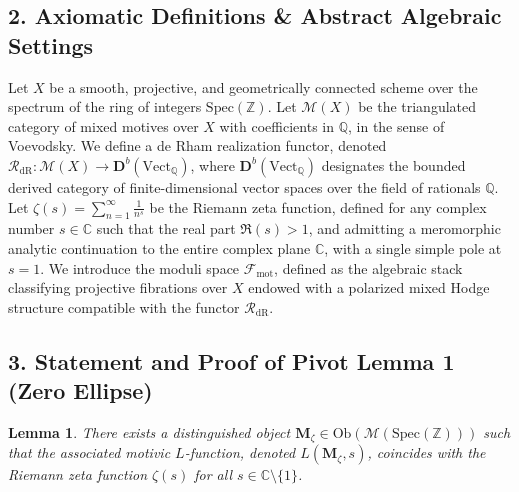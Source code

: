 \documentclass[
]{article}
\newtheorem{lemma}{Lemma}
\begin{document}
\hypertarget{axiomatic-definitions-abstract-algebraic-settings}{%
\subsection{2. Axiomatic Definitions \& Abstract Algebraic
Settings}\label{axiomatic-definitions-abstract-algebraic-settings}}

Let \(X\) be a smooth, projective, and geometrically connected scheme
over the spectrum of the ring of integers \(\mathrm{Spec}(\mathbb{Z})\).
Let \(\mathcal{M}(X)\) be the triangulated category of mixed motives
over \(X\) with coefficients in \(\mathbb{Q}\), in the sense of
Voevodsky. We define a de Rham realization functor, denoted
\(\mathcal{R}_{\mathrm{dR}} : \mathcal{M}(X) \rightarrow \mathbf{D}^b(\mathrm{Vect}_{\mathbb{Q}})\),
where \(\mathbf{D}^b(\mathrm{Vect}_{\mathbb{Q}})\) designates the
bounded derived category of finite-dimensional vector spaces over the
field of rationals \(\mathbb{Q}\). Let
\(\zeta(s) = \sum_{n=1}^{\infty} \frac{1}{n^s}\) be the Riemann zeta
function, defined for any complex number \(s \in \mathbb{C}\) such that
the real part \(\Re(s) > 1\), and admitting a meromorphic analytic
continuation to the entire complex plane \(\mathbb{C}\), with a single
simple pole at \(s=1\). We introduce the moduli space
\(\mathcal{F}_{\mathrm{mot}}\), defined as the algebraic stack
classifying projective fibrations over \(X\) endowed with a polarized
mixed Hodge structure compatible with the functor
\(\mathcal{R}_{\mathrm{dR}}\).

\hypertarget{statement-and-proof-of-pivot-lemma-1-zero-ellipse}{%
\subsection{3. Statement and Proof of Pivot Lemma 1 (Zero
Ellipse)}\label{statement-and-proof-of-pivot-lemma-1-zero-ellipse}}

\begin{lemma}
There exists a distinguished object
\(\mathbf{M}_{\zeta} \in \mathrm{Ob}(\mathcal{M}(\mathrm{Spec}(\mathbb{Z})))\)
such that the associated motivic \(L\)-function, denoted
\(L(\mathbf{M}_{\zeta}, s)\), coincides with the Riemann zeta function
\(\zeta(s)\) for all \(s \in \mathbb{C} \setminus \{1\}\).
\end{lemma}
\end{document}
